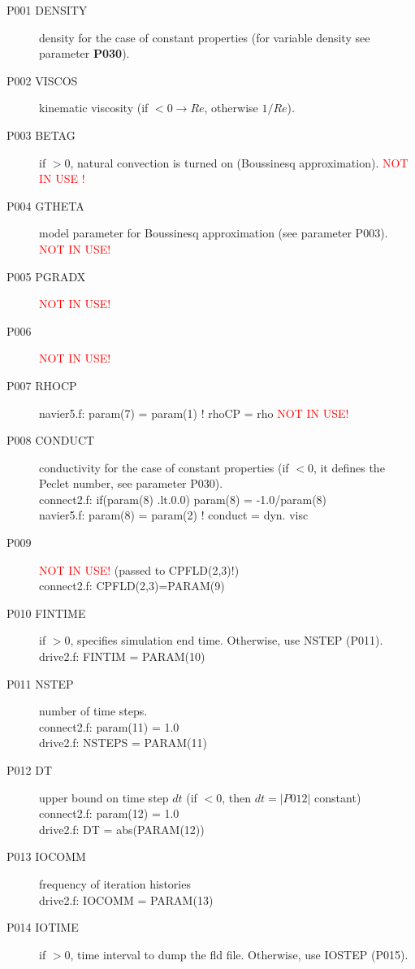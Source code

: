 \begin{description}
\item [P001  DENSITY] density for the case of constant properties (for variable density see parameter \textbf{P030}).
\item [P002  VISCOS]  kinematic viscosity (if \(<0 \rightarrow Re\), otherwise \(1/Re\)).
\item [P003  BETAG] if \(>0\), natural convection is turned on (Boussinesq approximation). {\textcolor{red}{NOT IN USE !}}
\item [P004  GTHETA] model parameter for Boussinesq approximation (see parameter P003). {\textcolor{red}{ NOT IN USE!}}
\item [P005  PGRADX] {\textcolor{red}{ NOT IN USE!}}
\item [P006  ] {\textcolor{red}{ NOT IN USE!}}
\item [P007  RHOCP] navier5.f:      param(7) = param(1)  ! rhoCP   = rho {\textcolor{red}{ NOT IN USE!}}
\item [P008  CONDUCT] conductivity for the case of constant properties (if \(<0\), it defines the Peclet number, see parameter P030). \\
connect2.f:      if(param(8) .lt.0.0) param(8)  = -1.0/param(8)\\
navier5.f:      param(8) = param(2)  ! conduct = dyn. visc
\item [P009  ] {\textcolor{red}{ NOT IN USE!}} (passed to CPFLD(2,3)!)\\
connect2.f:      CPFLD(2,3)=PARAM(9)
\item [P010  FINTIME] if \(>0\), specifies simulation end time. Otherwise, use NSTEP (P011).\\
drive2.f:      FINTIM = PARAM(10)
\item [P011  NSTEP] number of time steps.\\
connect2.f:            param(11) = 1.0\\
drive2.f:      NSTEPS = PARAM(11)
\item [P012  DT] upper bound on time step \(dt\)   (if \(<0\), then \(dt=|P012|\) constant)\\
connect2.f:            param(12) = 1.0\\
drive2.f:      DT     = abs(PARAM(12))
\item [P013  IOCOMM] frequency of iteration histories\\
drive2.f:      IOCOMM = PARAM(13)
\item [P014  IOTIME] if \(>0\), time interval to dump the fld file. Otherwise, use IOSTEP (P015).\\

\end{description}
